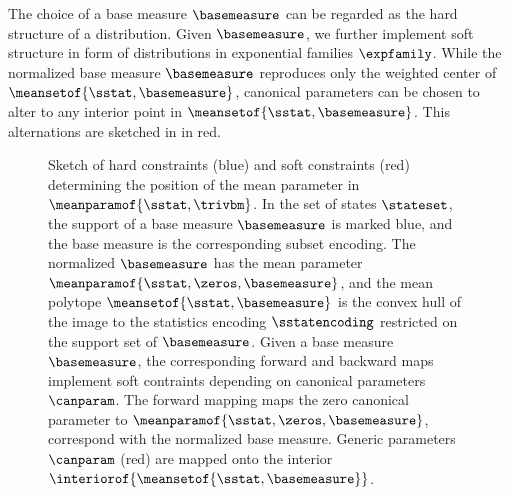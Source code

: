 The choice of a base measure $\basemeasure$ can be regarded as the hard structure of a distribution.
Given $\basemeasure$, we further implement soft structure in form of distributions in exponential families $\expfamily$.
While the normalized base measure $\basemeasure$ reproduces only the weighted center of $\meansetof{\sstat,\basemeasure}$, canonical parameters can be chosen to alter to any interior point in $\meansetof{\sstat,\basemeasure}$. %
This alternations are sketched in  in red.

\begin{figure}
    \begin{center}
        
    \end{center}
    \caption{
        Sketch of hard constraints (blue) and soft constraints (red) determining the position of the mean parameter in $\meanparamof{\sstat,\trivbm}$.
        In the set of states $\stateset$, the support of a base measure $\basemeasure$ is marked blue, and the base measure is the corresponding subset encoding.
        The normalized $\basemeasure$ has the mean parameter $\meanparamof{\sstat,\zeros,\basemeasure}$, and the mean polytope $\meansetof{\sstat,\basemeasure}$ is the convex hull of the image to the statistics encoding $\sstatencoding$ restricted on the support set of $\basemeasure$.
        Given a base measure $\basemeasure$, the corresponding forward and backward maps implement soft contraints depending on canonical parameters $\canparam$.
        The forward mapping maps the zero canonical parameter to $\meanparamof{\sstat,\zeros,\basemeasure}$, correspond with the normalized base measure.
        Generic parameters $\canparam$ (red) are mapped onto the interior $\interiorof{\meansetof{\sstat,\basemeasure}}$.
    }\label{fig:hs_mean_sketch}
\end{figure}